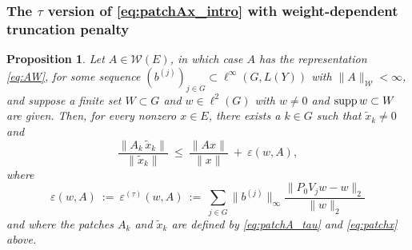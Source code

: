 \documentclass{article}
\newcommand\W{{\mathcal W}}
\newcommand\eps{{\varepsilon}}
\newcommand\supp{{\rm supp\,}}
\newtheorem{proposition}[theorem]{Proposition}
\numberwithin{equation}{section}   %
\numberwithin{figure}{section}  %
\begin{document}
\subsubsection{The $\tau$ version of \eqref{eq:patchAx_intro} with weight-dependent truncation penalty}
\begin{proposition} \label{prop:tau}
Let $A\in \W(E)$, in which case $A$ has the representation \eqref{eq:AW},
for some sequence $(b^{(j)})_{j\in G} \subset \ell^\infty(G,L(Y))$ with $\|A\|_\W <\infty$, and 
suppose a finite set $W\subset G$ and
$w\in \ell^2(G)$ with $w\neq 0$ and $\supp w\subset W$ 
 are given. Then, for every nonzero $x\in E$, there exists a $k\in G$ such that $\tilde x_k\ne 0$ and
\begin{equation} \label{eq:patchAx_tau}
\frac{\|A_{k}\, \tilde x_{k}\|}{\| \tilde x_{k}\|}\ \le\ \frac{\|Ax\|}{\|x\|}\ +\ \eps(w,A),
\end{equation}
where
\begin{equation} \label{eq:pen_tau}
\eps(w,A)\ :=\ \eps^{(\tau)}(w,A)\ :=\ \sum_{j\in G} \|b^{(j)}\|_\infty \frac{\|P_0V_jw-w\|_2}{\|w\|_2}
\end{equation}
and where the patches $A_k$ and $\tilde x_k$ are defined by \eqref{eq:patchA_tau} and \eqref{eq:patchx} above.
\end{proposition}
\end{document}
